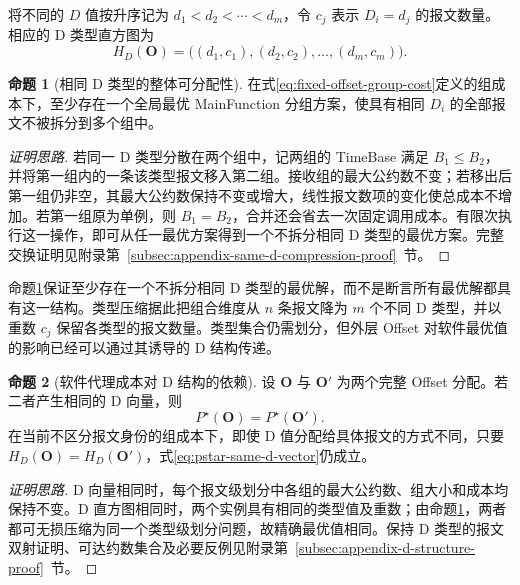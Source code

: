 \documentclass[UTF8,a4paper,twoside,zihao=-4]{ctexart}
\numberwithin{equation}{section}
\numberwithin{figure}{section}
\numberwithin{table}{section}
\theoremstyle{definition}
\newtheorem{proposition}{命题}
\numberwithin{algocf}{section}
\begin{document}
将不同的 $D$ 值按升序记为 $d_1<d_2<\cdots<d_m$，令 $c_j$ 表示 $D_i=d_j$ 的报文数量。相应的 D 类型直方图为
\begin{equation}
 H_D(\boldsymbol O)
 =
 \bigl((d_1,c_1),(d_2,c_2),\ldots,(d_m,c_m)\bigr).
\label{eq:d-histogram}
\end{equation}

\begin{proposition}[相同 D 类型的整体可分配性]
\label{prop:same-d-compression}
在式\eqref{eq:fixed-offset-group-cost}定义的组成本下，至少存在一个全局最优 MainFunction 分组方案，使具有相同 $D_i$ 的全部报文不被拆分到多个组中。
\end{proposition}

\begin{proof}[\normalfont 证明思路]
若同一 D 类型分散在两个组中，记两组的 TimeBase 满足 $B_1\le B_2$，并将第一组内的一条该类型报文移入第二组。接收组的最大公约数不变；若移出后第一组仍非空，其最大公约数保持不变或增大，线性报文数项的变化使总成本不增加。若第一组原为单例，则 $B_1=B_2$，合并还会省去一次固定调用成本。有限次执行这一操作，即可从任一最优方案得到一个不拆分相同 D 类型的最优方案。完整交换证明见附录第~\ref{subsec:appendix-same-d-compression-proof}~节。
\end{proof}

命题\ref{prop:same-d-compression}保证至少存在一个不拆分相同 D 类型的最优解，而不是断言所有最优解都具有这一结构。类型压缩据此把组合维度从 $n$ 条报文降为 $m$ 个不同 D 类型，并以重数 $c_j$ 保留各类型的报文数量。类型集合仍需划分，但外层 Offset 对软件最优值的影响已经可以通过其诱导的 D 结构传递。

\begin{proposition}[软件代理成本对 D 结构的依赖]
\label{prop:pstar-d-structure}
设 $\boldsymbol O$ 与 $\boldsymbol O'$ 为两个完整 Offset 分配。若二者产生相同的 D 向量，则
\begin{equation}
 P^\star(\boldsymbol O)=P^\star(\boldsymbol O').
\label{eq:pstar-same-d-vector}
\end{equation}
在当前不区分报文身份的组成本下，即使 D 值分配给具体报文的方式不同，只要
$H_D(\boldsymbol O)=H_D(\boldsymbol O')$，式\eqref{eq:pstar-same-d-vector}仍成立。
\end{proposition}

\begin{proof}[\normalfont 证明思路]
D 向量相同时，每个报文级划分中各组的最大公约数、组大小和成本均保持不变。D 直方图相同时，两个实例具有相同的类型值及重数；由命题\ref{prop:same-d-compression}，两者都可无损压缩为同一个类型级划分问题，故精确最优值相同。保持 D 类型的报文双射证明、可达约数集合及必要反例见附录第~\ref{subsec:appendix-d-structure-proof}~节。
\end{proof}
\end{document}
